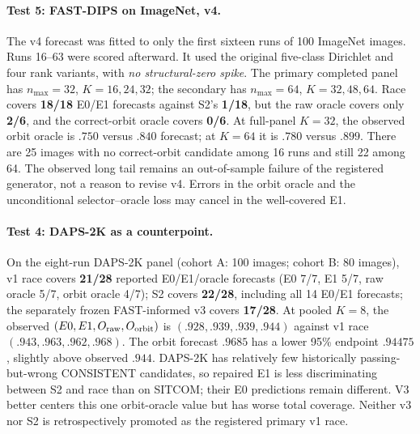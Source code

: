 \paragraph{Test 5: FAST-DIPS on ImageNet, v4.}
The v4 forecast was fitted to only the first
sixteen runs of 100 ImageNet images.
Runs 16--63 were scored afterward.
It used the original five-class Dirichlet and four
rank variants, with \emph{no structural-zero spike}.
The primary completed panel has $n_{\max}=32$,
$K=16,24,32$; the secondary has $n_{\max}=64$,
$K=32,48,64$. Race covers \textbf{18/18} E0/E1
forecasts against S2's \textbf{1/18}, but the raw oracle
covers only \textbf{2/6}, and the correct-orbit oracle
covers \textbf{0/6}. At full-panel $K=32$,
the observed orbit oracle is $.750$ versus $.840$
forecast; at $K=64$ it is $.780$ versus $.899$.
There are 25 images with no correct-orbit candidate
among 16 runs and still 22 among 64. The observed
long tail remains an out-of-sample failure of the
registered generator, not a reason to revise v4.
Errors in the orbit oracle and the unconditional
selector--oracle loss may cancel in the well-covered E1.

\paragraph{Test 4: DAPS-2K as a counterpoint.}
On the eight-run DAPS-2K panel (cohort A: 100 images;
cohort B: 80 images), v1 race covers \textbf{21/28}
reported E0/E1/oracle forecasts (E0 7/7, E1 5/7,
raw oracle 5/7, orbit oracle 4/7); S2 covers
\textbf{22/28}, including all 14 E0/E1 forecasts;
the separately frozen FAST-informed v3 covers
\textbf{17/28}. At pooled $K=8$, the observed
$(E0,E1,O_{\rm raw},O_{\rm orbit})$ is
$(.928,.939,.939,.944)$ against v1 race
$(.943,.963,.962,.968)$. The orbit forecast
$.9685$ has a lower 95\% endpoint $.94475$,
slightly above observed $.944$. DAPS-2K has relatively
few historically passing-but-wrong CONSISTENT candidates,
so repaired E1 is less discriminating between
S2 and race than on SITCOM; their E0 predictions
remain different. V3 better centers this one
orbit-oracle value but has worse total coverage.
Neither v3 nor S2 is retrospectively promoted as
the registered primary v1 race.

